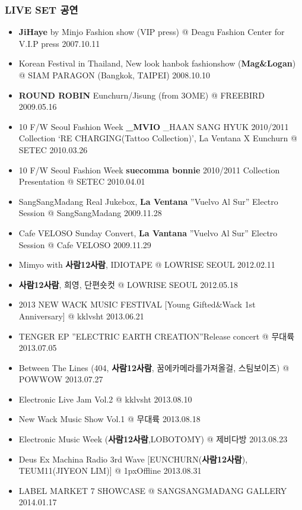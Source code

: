 \subsubsection{LIVE SET 공연}
\begin{itemize}
\item \textbf{JiHaye} by Minjo Fashion show (VIP press) @ Deagu Fashion Center for V.I.P press \hfill 2007.10.11
\item Korean Festival in Thailand, New look hanbok fashionshow (\textbf{Mag\&Logan}) @ SIAM PARAGON (Bangkok, TAIPEI) \hfill 2008.10.10
\item \textbf{ROUND ROBIN} Eunchurn/Jisung (from 3OME) @ FREEBIRD \hfill 2009.05.16
\item 10 F/W Seoul Fashion Week \textbf{\_MVIO} \_HAAN SANG HYUK 2010/2011 Collection ‘RE CHARGING(Tattoo Collection)’, La Ventana X Eunchurn @ SETEC \hfill 2010.03.26
\item 10 F/W Seoul Fashion Week \textbf{suecomma bonnie} 2010/2011 Collection Presentation @ SETEC \hfill 2010.04.01
\item SangSangMadang Real Jukebox, \textbf{La Ventana} ”Vuelvo Al Sur” Electro Session @ SangSangMadang \hfill 2009.11.28
\item Cafe VELOSO Sunday Convert, \textbf{La Vantana} ”Vuelvo Al Sur” Electro Session @ Cafe VELOSO \hfill 2009.11.29
\item Mimyo with \textbf{사람12사람}, IDIOTAPE @ LOWRISE SEOUL \hfill 2012.02.11
\item \textbf{사람12사람}, 희영, 단편숏컷 @ LOWRISE SEOUL \hfill 2012.05.18
\item 2013 NEW WACK MUSIC FESTIVAL [Young Gifted\&Wack 1st Anniversary] @ kklvsht \hfill 2013.06.21
\item TENGER EP ”ELECTRIC EARTH CREATION”Release concert @ 무대륙 \hfill 2013.07.05
\item Between The Lines (404, \textbf{사람12사람}, 꿈에카메라를가져올걸, 스팀보이즈) @ POWWOW \hfill 2013.07.27
\item Electronic Live Jam Vol.2 @ kklvsht \hfill 2013.08.10
\item New Wack Music Show Vol.1 @ 무대륙 \hfill 2013.08.18
\item Electronic Music Week (\textbf{사람12사람},LOBOTOMY) @ 제비다방 \hfill 2013.08.23
\item Deus Ex Machina Radio 3rd Wave [EUNCHURN(\textbf{사람12사람}), TEUM11(JIYEON LIM)] @ 1pxOffline \hfill 2013.08.31
\item LABEL MARKET 7 SHOWCASE @ SANGSANGMADANG GALLERY \hfill 2014.01.17

\end{itemize}
